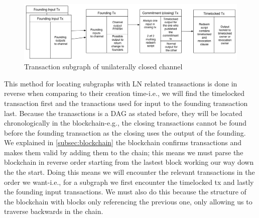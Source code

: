 \begin{figure}[h]
    \centering
    \includegraphics[width=14cm]{figures/ln_tx_graph.png}
    \caption{Transaction subgraph of unilaterally closed channel}
    \label{fig:ln_tx_graph}
\end{figure}


This method for locating subgraphs with LN related transactions is done in reverse when comparing to their creation time-i.e., we will find the timelocked transaction first and the tranactions used for input to the founding transaction last.
Because the tranasctions is a DAG as stated before, they will be located chronologically in the blockchain-e.g., the closing transactions cannot be found before the founding transaction as the closing uses the output of the founding.
We explained in \cref{subsec:blockchain} the blockchain confirms transactions and makes them valid by adding them to the chain; this means we must parse the blockchain in reverse order starting from the lastest block working our way down the the start. Doing this means we will encounter the relevant transactions in the order we want-i.e., for a subgraph we first encounter the timelocked tx and lastly the founding input transactions. We must also do this because the structure of the blockchain with blocks only referencing the previous one, only allowing us to traverse backwards in the chain. 
\\

